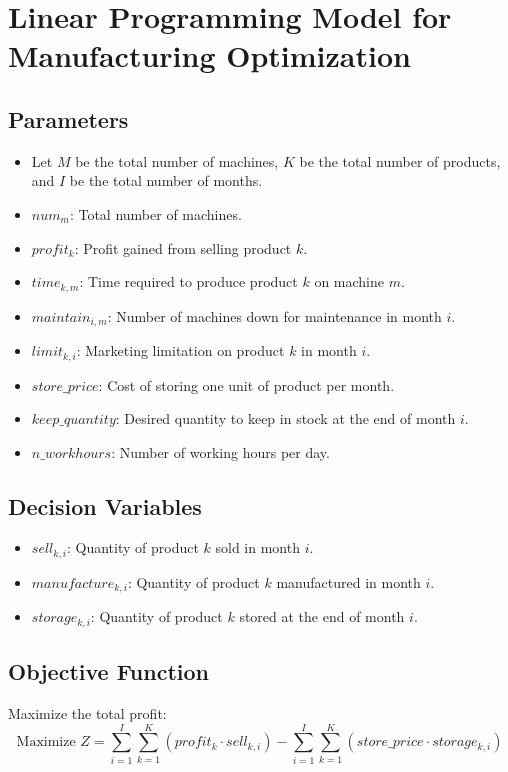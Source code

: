 \documentclass{article}
\begin{document}
\section*{Linear Programming Model for Manufacturing Optimization}

\subsection*{Parameters}
\begin{itemize}
    \item Let \( M \) be the total number of machines, \( K \) be the total number of products, and \( I \) be the total number of months.
    \item \( num_m \): Total number of machines.
    \item \( profit_k \): Profit gained from selling product \( k \).
    \item \( time_{k,m} \): Time required to produce product \( k \) on machine \( m \).
    \item \( maintain_{i,m} \): Number of machines down for maintenance in month \( i \).
    \item \( limit_{k,i} \): Marketing limitation on product \( k \) in month \( i \).
    \item \( store\_price \): Cost of storing one unit of product per month.
    \item \( keep\_quantity \): Desired quantity to keep in stock at the end of month \( i \).
    \item \( n\_workhours \): Number of working hours per day.
\end{itemize}

\subsection*{Decision Variables}
\begin{itemize}
    \item \( sell_{k,i} \): Quantity of product \( k \) sold in month \( i \).
    \item \( manufacture_{k,i} \): Quantity of product \( k \) manufactured in month \( i \).
    \item \( storage_{k,i} \): Quantity of product \( k \) stored at the end of month \( i \).
\end{itemize}

\subsection*{Objective Function}
Maximize the total profit:
\[
\text{Maximize } Z = \sum_{i=1}^{I} \sum_{k=1}^{K} (profit_k \cdot sell_{k,i}) - \sum_{i=1}^{I} \sum_{k=1}^{K} (store\_price \cdot storage_{k,i})
\]
\end{document}
